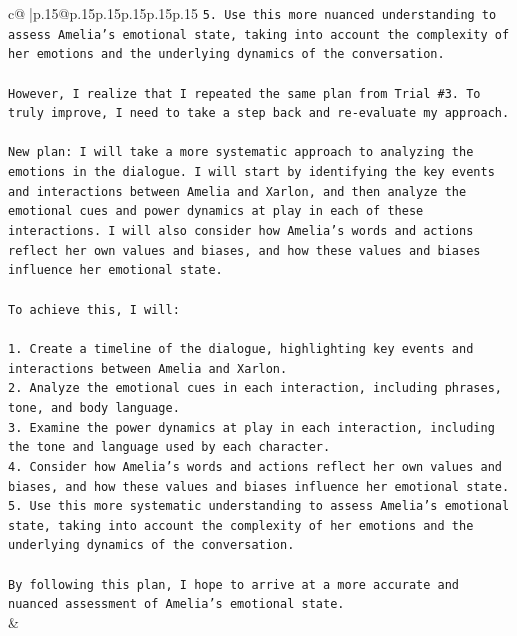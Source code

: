 \documentclass{article}
\begin{document}
{\begin{supertabular}{c@{$\;$}|p{.15\linewidth}@{}p{.15\linewidth}p{.15\linewidth}p{.15\linewidth}p{.15\linewidth}p{.15\linewidth}}
{{{\texttt{5. Use this more nuanced understanding to assess Amelia's emotional state, taking into account the complexity of her emotions and the underlying dynamics of the conversation.} \\
\\ 
\texttt{However, I realize that I repeated the same plan from Trial \#3. To truly improve, I need to take a step back and re{-}evaluate my approach.} \\
\\ 
\texttt{New plan: I will take a more systematic approach to analyzing the emotions in the dialogue. I will start by identifying the key events and interactions between Amelia and Xarlon, and then analyze the emotional cues and power dynamics at play in each of these interactions. I will also consider how Amelia's words and actions reflect her own values and biases, and how these values and biases influence her emotional state.} \\
\\ 
\texttt{To achieve this, I will:} \\
\\ 
\texttt{1. Create a timeline of the dialogue, highlighting key events and interactions between Amelia and Xarlon.} \\
\texttt{2. Analyze the emotional cues in each interaction, including phrases, tone, and body language.} \\
\texttt{3. Examine the power dynamics at play in each interaction, including the tone and language used by each character.} \\
\texttt{4. Consider how Amelia's words and actions reflect her own values and biases, and how these values and biases influence her emotional state.} \\
\texttt{5. Use this more systematic understanding to assess Amelia's emotional state, taking into account the complexity of her emotions and the underlying dynamics of the conversation.} \\
\\ 
\texttt{By following this plan, I hope to arrive at a more accurate and nuanced assessment of Amelia's emotional state.} \\
            }
        }
    }
    & \\ \\

\end{supertabular}
}
\end{document}
